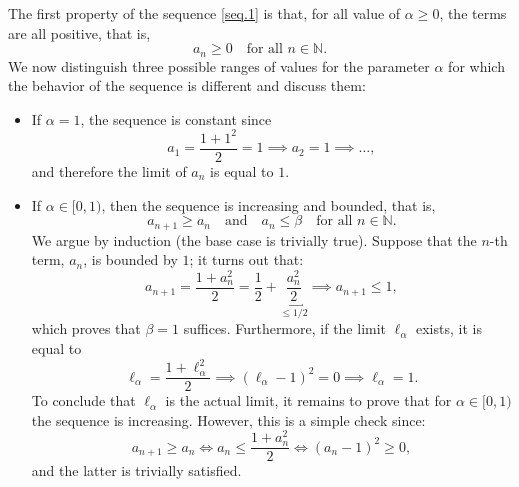 \documentclass[a4paper,10 pt]{report}
\theoremstyle{definition}
\newcommand{\N}{\mathbb N}
\begin{document}
\begin{solutionBox} The first property of the sequence \eqref{seq.1} is that, for all value of $\alpha \geq 0$, the terms are all positive, that is,
\begin{equation*} a_n \geq 0 \quad \text{for all $n \in \N$}. \end{equation*}
We now distinguish three possible ranges of values for the parameter $\alpha$ for which the behavior of the sequence is different and discuss them:

\begin{itemize}
	\item If $\alpha = 1$, the sequence is constant since
\begin{equation*} a_1 = \frac{1 + 1^2}{2} = 1 \implies a_2 = 1 \implies \dots, \end{equation*}
and therefore the limit of $a_n$ is equal to $1$.

\item If $\alpha \in [0,1)$, then the sequence is increasing and bounded, that is,
\begin{equation*} a_{n + 1} \geq a_n \quad \text{and} \quad a_n \leq \beta \quad \text{for all $n \in \N$}. \end{equation*}
We argue by induction (the base case is trivially true). Suppose that the $n$-th term, $a_n$, is bounded by $1$; it turns out that:
\begin{equation*}a_{n + 1} = \frac{1 + a_n^2}{2} = \frac{1}{2} + \underbracket{\frac{a_n^2}{2}}_{\leq 1/2} \implies a_{n + 1} \leq 1, \end{equation*}
which proves that $\beta = 1$ suffices. Furthermore, if the limit $\ell_\alpha$ exists, it is equal to
\begin{equation*}\ell_\alpha = \frac{1 + \ell_\alpha^2}{2} \implies (\ell_\alpha - 1)^2 = 0 \implies \ell_\alpha = 1. \end{equation*}
To conclude that $\ell_\alpha$ is the actual limit, it remains to prove that for $\alpha \in [0, 1)$ the sequence is increasing. However, this is a simple check since:
\begin{equation*}a_{n + 1} \geq a_n \iff a_n \leq \frac{1 + a_n^2}{2} \iff (a_n - 1)^2 \geq 0, \end{equation*}
and the latter is trivially satisfied.


\end{itemize}
\end{solutionBox}
\end{document}
